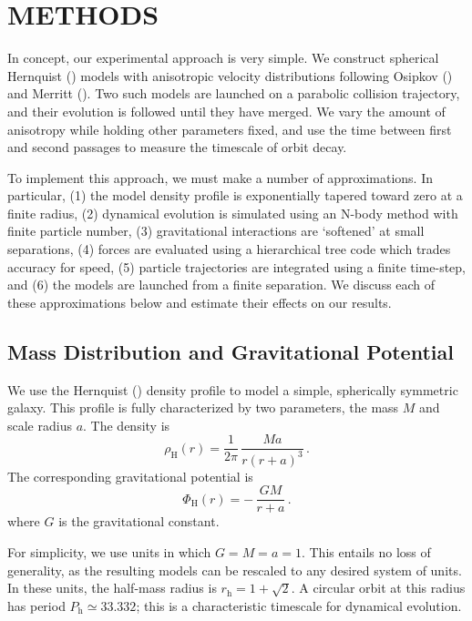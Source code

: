 \documentclass[fleqn,usenatbib]{mnras}
\begin{document}
\section{METHODS}
\label{sec:methods}

In concept, our experimental approach is very simple. We construct spherical Hernquist (\citeyear{Hernquist1990}) models with anisotropic velocity distributions following Osipkov (\citeyear{Osipkov1979}) and Merritt (\citeyear{Merritt1985}). Two such models are launched on a parabolic collision trajectory, and their evolution is followed until they have merged. We vary the amount of anisotropy while holding other parameters fixed, and use the time between first and second passages to measure the timescale of orbit decay.

To implement this approach, we must make a number of approximations. In particular, (1) the model density profile is exponentially tapered toward zero at a finite radius, (2) dynamical evolution is simulated using an N-body method with finite particle number, (3) gravitational interactions are `softened' at small separations, (4) forces are evaluated using a hierarchical tree code which trades accuracy for speed, (5) particle trajectories are integrated using a finite time-step, and (6) the models are launched from a finite separation. We discuss each of these approximations below and estimate their effects on our results.

\subsection{Mass Distribution and Gravitational Potential}
\label{sec:mass_model}

We use the Hernquist (\citeyear{Hernquist1990}) density profile to model a simple, spherically symmetric galaxy. This profile is fully characterized by two parameters, the mass $M$ and scale radius $a$. The density is 
\begin{equation}
    \rho_\mathrm{H}(r)=\frac{1}{2 \pi} \, \frac{M a}{r (r+a)^3} \, .
    \label{eq:hernquist_profile}
\end{equation}
The corresponding gravitational potential is 
\begin{equation}
    \Phi_\mathrm{H}(r)= - \, \frac{G M}{r+a} \, .
    \label{eq:hernquist_potential}
\end{equation}
where $G$ is the gravitational constant. 

For simplicity, we use units in which $G = M = a = 1$. This entails no loss of generality, as the resulting models can be rescaled to any desired system of units. In these units, the half-mass radius is $r_\mathrm{h} = 1 + \sqrt{2}$. A circular orbit at this radius has period $P_\mathrm{h} \simeq 33.332$; this is a characteristic timescale for dynamical evolution.
\end{document}
